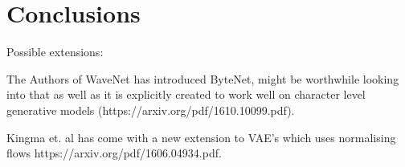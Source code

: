 \chapter{Conclusions}
\label{ConclusionsCh}

Possible extensions:

The Authors of WaveNet has introduced ByteNet, might be
worthwhile looking into that as well as it is explicitly created to work well on
character level generative models (https://arxiv.org/pdf/1610.10099.pdf).

Kingma et. al has come with a new extension to VAE's which uses normalising
flows https://arxiv.org/pdf/1606.04934.pdf.